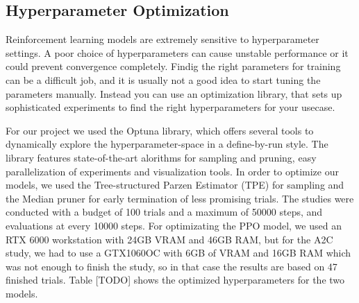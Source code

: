 \documentclass{article}
\begin{document}
\subsection{\normalsize{Hyperparameter Optimization}}
Reinforcement learning models are extremely sensitive to hyperparameter settings. A poor choice of hyperparameters can cause unstable performance or it could prevent convergence completely. Findig the right parameters for training can be a difficult job, and it is usually not a good idea to start tuning the parameters manually. Instead you can use an optimization library, that sets up sophisticated experiments to find the right hyperparameters for your usecase.

For our project we used the Optuna library, which offers several tools to dynamically explore the hyperparameter-space in a define-by-run style. The library features state-of-the-art alorithms for sampling and pruning, easy parallelization of experiments and visualization tools. In order to optimize our models, we used the Tree-structured Parzen Estimator (TPE) for sampling and the Median pruner for early termination of less promising trials. The studies were conducted with a budget of 100 trials and a maximum of 50000 steps, and evaluations at every 10000 steps. For optimizating the PPO model, we used an RTX 6000 workstation with 24GB VRAM and 46GB RAM, but for the A2C study, we had to use a GTX1060OC with 6GB of VRAM and 16GB RAM which was not enough to finish the study, so in that case the results are based on 47 finished trials. Table [TODO] shows the optimized hyperparameters for the two models.
\end{document}
